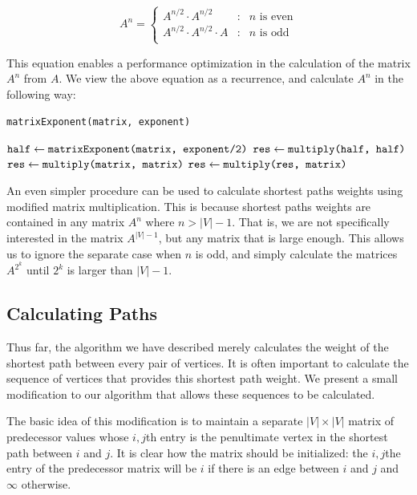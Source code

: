 \documentclass[12pt,twoside]{reedthesis}
\newcommand{\procedure}[1]{{\tt#1}}
\newcommand{\var}[1]{{\mbox{\tt#1}}}
\begin{document}
\begin{displaymath}
   A^n = \left\{
     \begin{array}{lcl}
       A^{n/2} \cdot A^{n/2} & : & n \mbox{ is even} \\
       A^{n/2} \cdot A^{n/2} \cdot A  & : & n \mbox{ is odd}\\
     \end{array}
   \right.
\end{displaymath}

This equation enables a performance optimization in the calculation of the matrix $A^{n}$ from $A$. We view the above equation as a recurrence, and calculate $A^n$ in the following way:

\begin{algorithm}
\procedure{matrixExponent(matrix, exponent)}
\begin{algorithmic}[1]
\IF{$\var{exponent} > 3$}
\STATE $\var{half} \gets \var{matrixExponent(matrix, exponent/2)}$
\STATE $\var{res} \gets \var{multiply(half, half)}$
\ELSE
\STATE $\var{res} \gets \var{multiply(matrix, matrix)}$
\ENDIF
\IF{$\var{exponent} \mod 2 = 1$}
\STATE $\var{res} \gets \var{multiply(res, matrix)}$
\ENDIF
\RETURN \var{res}
\end{algorithmic}
\end{algorithm}

An even simpler procedure can be used to calculate shortest paths weights using modified matrix multiplication. This is because shortest paths weights are contained in any matrix $A^n$ where $n > |V|-1$. That is, we are not specifically interested in the matrix $A^{|V| - 1}$, but any matrix that is large enough. This allows us to ignore the separate case when $n$ is odd, and simply calculate the matrices $A^{2^k}$ until $2^k$ is larger than $|V| - 1$.

\subsection{Calculating Paths}

Thus far, the algorithm we have described merely calculates the weight of the shortest path between every pair of vertices. It is often important to calculate the sequence of vertices that provides this shortest path weight. We present a small modification to our algorithm that allows these sequences to be calculated.

The basic idea of this modification is to maintain a separate $|V| \times |V|$ matrix of predecessor values whose $i,j$th entry is the penultimate vertex in the shortest path between $i$ and $j$. It is clear how the matrix should be initialized: the $i,j$the entry of the predecessor matrix will be $i$ if there is an edge between $i$ and $j$ and $\infty$ otherwise.
\end{document}

